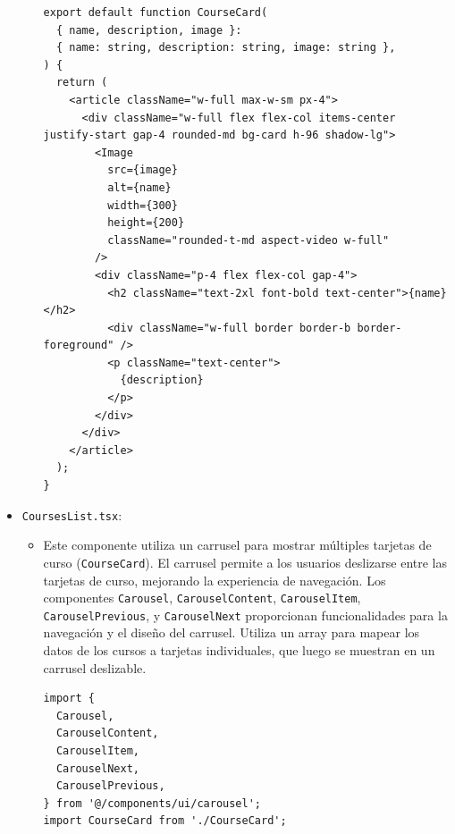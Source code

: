\begin{itemize}
\begin{itemize}
\begin{verbatim}
export default function CourseCard(
  { name, description, image }:
  { name: string, description: string, image: string },
) {
  return (
    <article className="w-full max-w-sm px-4">
      <div className="w-full flex flex-col items-center justify-start gap-4 rounded-md bg-card h-96 shadow-lg">
        <Image
          src={image}
          alt={name}
          width={300}
          height={200}
          className="rounded-t-md aspect-video w-full"
        />
        <div className="p-4 flex flex-col gap-4">
          <h2 className="text-2xl font-bold text-center">{name}</h2>
          <div className="w-full border border-b border-foreground" />
          <p className="text-center">
            {description}
          </p>
        </div>
      </div>
    </article>
  );
}
    \end{verbatim}
  \end{itemize} 
  \item \texttt{CoursesList.tsx}:
  \begin{itemize}
    \item Este componente utiliza un carrusel para mostrar múltiples tarjetas de curso (\texttt{CourseCard}). El carrusel permite a los usuarios deslizarse entre las tarjetas de curso, mejorando la experiencia de navegación. Los componentes \texttt{Carousel}, \texttt{CarouselContent}, \texttt{CarouselItem}, \texttt{CarouselPrevious}, y \texttt{CarouselNext} proporcionan funcionalidades para la navegación y el diseño del carrusel. Utiliza un array para mapear los datos de los cursos a tarjetas individuales, que luego se muestran en un carrusel deslizable.
    \begin{verbatim}
import {
  Carousel,
  CarouselContent,
  CarouselItem,
  CarouselNext,
  CarouselPrevious,
} from '@/components/ui/carousel';
import CourseCard from './CourseCard';


\end{verbatim}
\end{itemize}
\end{itemize}
